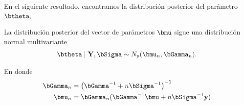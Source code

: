 En el siguiente resultado, encontramos la distribuci\'on posterior del parámetro $\btheta$.
\begin{Res}\label{res_mu_n}
La distribución posterior del vector de parámetros $\bmu$ sigue una distribución normal multivariante
\begin{equation*}
\btheta \mid \mathbf{Y},\bSigma \sim N_p (\bmu_n,\bGamma_n).
\end{equation*}

En donde
\begin{align}\label{mu_nGamma_n}
\bGamma_n &= \left(\bGamma^{-1}+n\bSigma^{-1}\right)^{-1}\\
\bmu_n &= \bGamma_n(\bGamma^{-1}\bmu+n \bSigma^{-1}\bar{\mathbf{y}})
\end{align}
\end{Res}


